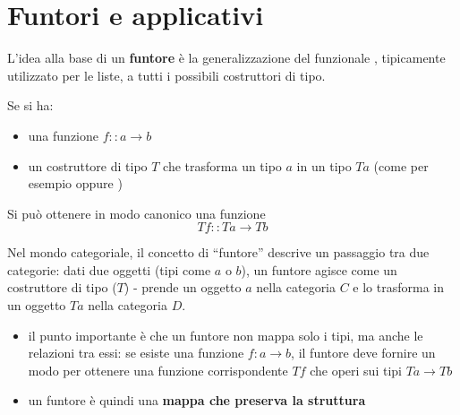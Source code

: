 \documentclass[a4paper,11pt]{report}
\begin{document}
\section{Funtori e applicativi}
L'idea alla base di un \textbf{funtore} è la generalizzazione del funzionale , tipicamente utilizzato per le liste, a tutti i possibili costruttori di tipo.

Se si ha:
\begin{itemize}
    \item una funzione $f:: a\to b$
    \item un costruttore di tipo $T$ che trasforma un tipo $a$ in un tipo $T a$ (come per esempio \code{[a]} oppure )
\end{itemize}

Si può ottenere in modo canonico una funzione
$$T f :: T a \to T b$$

\begin{center}
\end{center}

\begin{gframe}{}
Nel mondo categoriale, il concetto di ``funtore'' descrive un passaggio tra due categorie: dati due oggetti (tipi come $a$ o $b$), un funtore agisce come un costruttore di tipo ($T$) - prende un oggetto $a$ nella categoria $C$ e lo trasforma in un oggetto $T a$ nella categoria $D$.
\begin{itemize}
    \item il punto importante è che un funtore non mappa solo i tipi, ma anche le relazioni tra essi: se esiste una funzione $f : a \to b$, il funtore deve fornire un modo per ottenere una funzione corrispondente $T f$ che operi sui tipi $T a \to T b$
    \item un funtore è quindi una \textbf{mappa che preserva la struttura}
\end{itemize}
\end{gframe}
\end{document}
